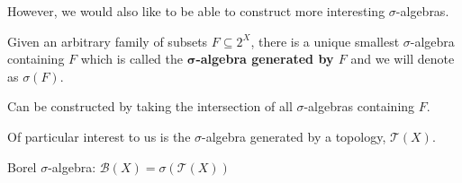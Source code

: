 However, we would also like to be able to construct more interesting $\sigma$-algebras.

\begin{definition}
Given an arbitrary family of subsets $F \subseteq 2^X$, there is a unique smallest $\sigma$-algebra containing $F$ which is called the \textbf{$\mathbf{\sigma}$-algebra generated by $F$} and we will denote as $\sigma(F)$.
\end{definition}

Can be constructed by taking the intersection of all $\sigma$-algebras containing $F$.

Of particular interest to us is the $\sigma$-algebra generated by a topology, $\mathcal{T}(X)$. 

Borel $\sigma$-algebra: $\mathcal{B}(X) = \sigma(\mathcal{T}(X))$


